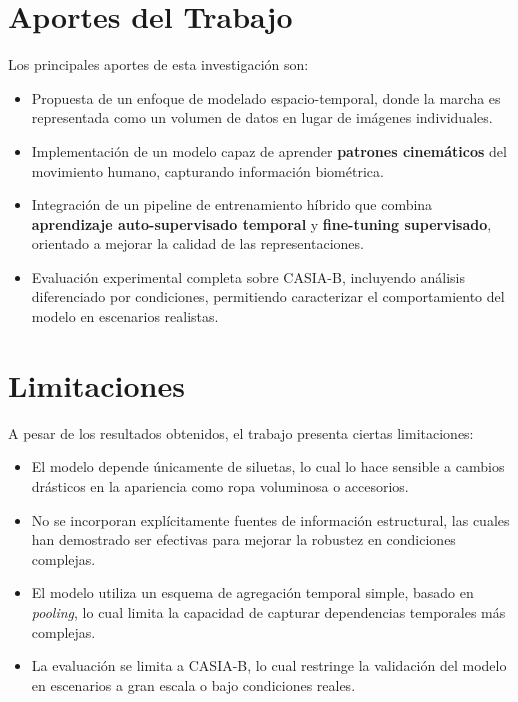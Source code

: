 \section{Aportes del Trabajo}

Los principales aportes de esta investigación son:

\begin{itemize}
    \item Propuesta de un enfoque de modelado espacio-temporal, donde la marcha es representada como un volumen de datos en lugar de imágenes individuales.

    \item Implementación de un modelo capaz de aprender \textbf{patrones cinemáticos} del movimiento humano, capturando información biométrica.

    \item Integración de un pipeline de entrenamiento híbrido que combina \textbf{aprendizaje auto-supervisado temporal} y \textbf{fine-tuning supervisado}, orientado a mejorar la calidad de las representaciones.

    \item Evaluación experimental completa sobre CASIA-B, incluyendo análisis diferenciado por condiciones, permitiendo caracterizar el comportamiento del modelo en escenarios realistas.
\end{itemize}

\section{Limitaciones}

A pesar de los resultados obtenidos, el trabajo presenta ciertas limitaciones:

\begin{itemize}
    \item El modelo depende únicamente de siluetas, lo cual lo hace sensible a cambios drásticos en la apariencia como ropa voluminosa o accesorios.
    \item No se incorporan explícitamente fuentes de información estructural, las cuales han demostrado ser efectivas para mejorar la robustez en condiciones complejas.
    \item El modelo utiliza un esquema de agregación temporal simple, basado en \textit{pooling}, lo cual limita la capacidad de capturar dependencias temporales más complejas.
    \item La evaluación se limita a CASIA-B, lo cual restringe la validación del modelo en escenarios a gran escala o bajo condiciones reales.
\end{itemize}

